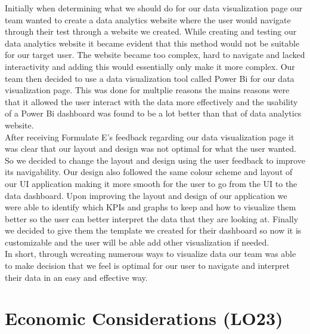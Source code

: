 \documentclass[12pt]{article}
\begin{document}
Initially when determining what we should do for our data visualization page our team wanted to create a data analytics website where the user would navigate through their test through a website we created. While creating and testing our data analytics website it became evident that this method would not be suitable for our target user. The website became too complex, hard to navigate and lacked interactivity and adding this would essentially only make it more complex. Our team then decided to use a data visualization tool called Power Bi for our data visualization page. This was done for multplie reasons the mains reasons were that it allowed the user interact with the data more effectively and the usability of a Power Bi dashboard was found to be a lot better than that of data analytics website.\\

After receiving Formulate E's feedback regarding our data visualization page it was clear that our layout and design was not optimal for what the user wanted. So we decided to change the layout and design using the user feedback to improve its navigability. Our design also followed the same colour scheme and layout of our UI application making it more smooth for the user to go from the UI to the data dashboard. Upon improving the layout and design of our application we were able to identify which KPIs and graphs to keep and how to visualize them better so the user can better interpret the data that they are looking at. Finally we decided to give them the template we created for their dashboard so now it is customizable and the user will be able add other visualization if needed.\\

In short, through wcreating numerous ways to visualize data our team was able to make decision that we feel is optimal for our user to navigate and interpret their data in an easy and effective way.


\section{Economic Considerations (LO23)}

\end{document}
